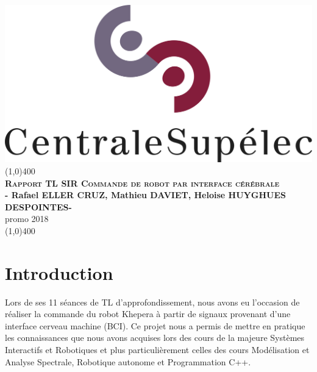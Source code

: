 \documentclass[11pt]{article}
\begin{document}

\begin{titlepage}
\begin{center}
\includegraphics[scale=0.5]{CentraleSupelec.jpeg}\\
\vfill
\line(1,0){400}\\[1mm]
\huge{\textsc{\textbf{Rapport TL SIR Commande de robot par interface cérébrale}}}\\[3mm]
\Large{\textbf{- Rafael ELLER CRUZ, Mathieu DAVIET, Heloise HUYGHUES DESPOINTES-}}\\[1mm]
\Large{promo 2018}\\[1mm]
\line(1,0){400}\\[1mm]

\vfill

\end{center}
\end{titlepage}


\tableofcontents
\thispagestyle{empty}
\cleardoublepage


\setcounter{page}{1}
\section{Introduction}

Lors de ses 11 séances de TL d'approfondissement, nous avons eu l'occasion de réaliser la commande du robot Khepera à partir de signaux provenant d'une interface cerveau machine (BCI). Ce projet nous a permis de mettre en pratique les connaissances que nous avons acquises lors des cours de la majeure Systèmes Interactifs et Robotiques et plus particulièrement celles des cours Modélisation et Analyse Spectrale, Robotique autonome et Programmation C++.\\
\end{document}

